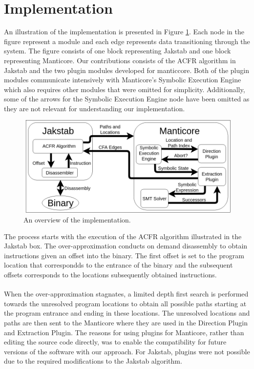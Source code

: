 \documentclass{kththesis}
\newcommand{\fbcomment}[1]{{#1}}
\renewcommand{\fbcomment}[1]{}
\begin{document}
\section{Implementation}
\fbcomment{\color{red}Goal: Describe how Manticore was implemented (Considering to remove this section as I am not sure that is it "scientifically relevant")}
An illustration of the implementation is presented in Figure \ref{fig:implementationOverview}. Each node in the figure represent a module and each edge represents data transitioning through the system. The figure consists of one block representing Jakstab and one block representing Manticore. Our contributions consists of the ACFR algorithm in Jakstab and the two plugin modules developed for manticcore. Both of the plugin modules communicate intensively with Manticore's Symbolic Execution Engine which also requires other modules that were omitted for simplicity. Additionally, some of the arrows for the Symbolic Execution Engine node have been omitted as they are not relevant for understanding our implementation.
\begin{figure}[ht]
    \centering
    \includegraphics[scale=0.41]{Images/ImplementationOverview.png}
    \caption{An overview of the implementation.}
    \label{fig:implementationOverview}
\end{figure}
The process starts with the execution of the ACFR algorithm illustrated in the Jakstab box. The over-approximation conducts on demand disassembly to obtain instructions given an offset into the binary. The first offset is set to the program location that correspondds to the entrance of the binary and the subsequent offsets corresponds to the locations subsequently obtained instructions. 
\\ \\
When the over-approximation stagnates, a limited depth first search is performed towards the unresolved program locations to obtain all possible paths starting at the program entrance and ending in these locations. The unresolved locations and paths are then sent to the Manticore where they are used in the Direction Plugin and Extraction Plugin. The reasons for using plugins for Manticore, rather than editing the source code directly, was to enable the compatibility for future versions of the software with our approach. For Jakstab, plugins were not possible due to the required modifications to the Jakstab algorithm.
\end{document}
